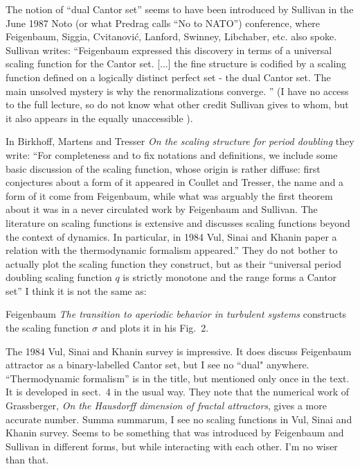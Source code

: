 \begin{description}
The notion of ``dual Cantor set'' seems to have been introduced by
Sullivan in the June 1987 Noto (or what Predrag calls ``No
to NATO'') conference, where Feigenbaum, Siggia,
Cvitanovi{\'c}, Lanford, Swinney, Libchaber, etc. also spoke. Sullivan
writes: ``Feigenbaum expressed this discovery in terms of a universal
scaling function for the Cantor set. [...] the fine structure is codified
by a scaling function defined on a logically distinct perfect set - the
dual Cantor set. The main unsolved mystery is why the renormalizations
converge. '' (I have no access to the full lecture, so do not know what
other credit Sullivan gives to whom, but it also appears in the equally
unaccessible ).

In Birkhoff, Martens and Tresser
{\em On the scaling structure for period doubling} they write:
``For  completeness  and  to fix notations  and  definitions,  we include
some  basic discussion  of the scaling function,  whose origin is rather
diffuse:  first  conjectures  about a form  of it  appeared  in Coullet
and Tresser, the name and a  form  of it  come from
Feigenbaum, while what  was  arguably the first theorem
about  it was in a never circulated  work by Feigenbaum  and  Sullivan.
The literature  on  scaling functions  is  extensive  and  discusses
scaling functions  beyond  the context  of dynamics.  In  particular,  in
1984 Vul, Sinai and Khanin paper  a  relation  with  the
thermodynamic  formalism  appeared.''
They do not bother to actually plot the scaling function they construct,
but as their ``universal period doubling scaling function $q$ is strictly
monotone and the range forms a Cantor set'' I think it is not the same
as:

Feigenbaum {\em The transition to aperiodic behavior in
turbulent systems} constructs the scaling function $\sigma$ and plots it in
his Fig.~2.

The 1984 Vul, Sinai and Khanin survey is impressive. It does
discuss Feigenbaum attractor as a binary-labelled Cantor set, but I see
no ``dual" anywhere. ``Thermodynamic formalism'' is in the title, but
mentioned only once in the text. It is developed in sect.~4 in the usual
way. They note that the numerical work of Grassberger,
{\em On the {Hausdorff} dimension of fractal attractors}, gives a more
accurate number. Summa summarum, I see no scaling functions in Vul, Sinai
and Khanin survey. Seems to be something that was introduced
by Feigenbaum and Sullivan in different forms, but while interacting with
each other. I'm no wiser than that.

\end{description}



\printbibliography[heading=subbibintoc,title={References}]
